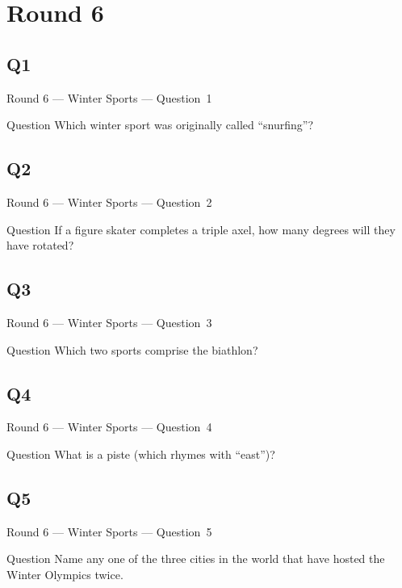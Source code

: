 \documentclass[11pt]{beamer}
\begin{document}
\section{Round 6}
\subsection*{Q1}
\begin{frame}[t]{Round 6 --- Winter Sports --- \mbox{Question 1}}
    \vspace{-0.5em}
    \begin{block}{Question}
        Which winter sport was originally called ``snurfing''?
    \end{block}
\end{frame}
\subsection*{Q2}
\begin{frame}[t]{Round 6 --- Winter Sports --- \mbox{Question 2}}
    \vspace{-0.5em}
    \begin{block}{Question}
        If a figure skater completes a triple axel, how many degrees will they have rotated?
    \end{block}
\end{frame}
\subsection*{Q3}
\begin{frame}[t]{Round 6 --- Winter Sports --- \mbox{Question 3}}
    \vspace{-0.5em}
    \begin{block}{Question}
        Which two sports comprise the biathlon?
    \end{block}
\end{frame}
\subsection*{Q4}
\begin{frame}[t]{Round 6 --- Winter Sports --- \mbox{Question 4}}
    \vspace{-0.5em}
    \begin{block}{Question}
        What is a piste (which rhymes with ``east'')?
    \end{block}
\end{frame}
\subsection*{Q5}
\begin{frame}[t]{Round 6 --- Winter Sports --- \mbox{Question 5}}
    \vspace{-0.5em}
    \begin{block}{Question}
        Name any one of the three  cities in the world that have hosted the Winter Olympics twice.
    \end{block}
\end{frame}
\end{document}
